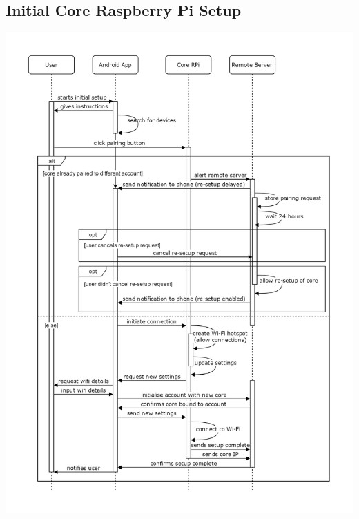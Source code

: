 \subsection{Initial Core Raspberry Pi Setup}
\begin{center}
	\includegraphics[width=\textwidth,height=\textheight,keepaspectratio]{"Graphics/Initial Core RPi Setup"}
\end{center}

\newpage
